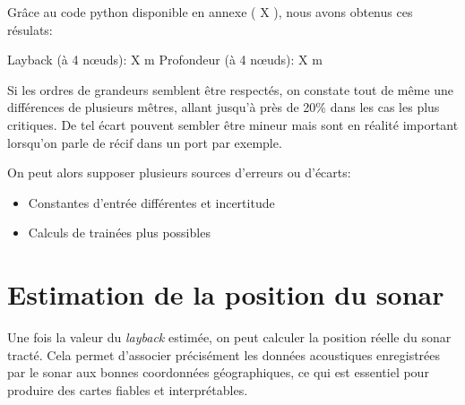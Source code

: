 \documentclass[12pt,a4paper]{report}
\begin{document}
Grâce au code python disponible en annexe ( X ), nous avons obtenus ces résulats:

Layback (à 4 nœuds): X m
Profondeur (à 4 nœuds): X m

Si les ordres de grandeurs semblent être respectés, on constate tout de même une différences de plusieurs mêtres,
allant jusqu'à près de 20\% dans les cas les plus critiques.
De tel écart pouvent sembler être mineur mais sont en réalité important lorsqu'on parle de récif dans un port par exemple.

On peut alors supposer plusieurs sources d'erreurs ou d'écarts:
\begin{itemize}
  \item Constantes d'entrée différentes et incertitude
  \item Calculs de trainées plus possibles
\end{itemize}


\section{Estimation de la position du sonar}
\begin{figure}[H]
\end{figure}

Une fois la valeur du \textit{layback} estimée, on peut calculer la position réelle du sonar tracté. Cela permet
d’associer précisément les données acoustiques enregistrées par le sonar aux bonnes coordonnées géographiques, ce qui
est essentiel pour produire des cartes fiables et interprétables.
\end{document}
